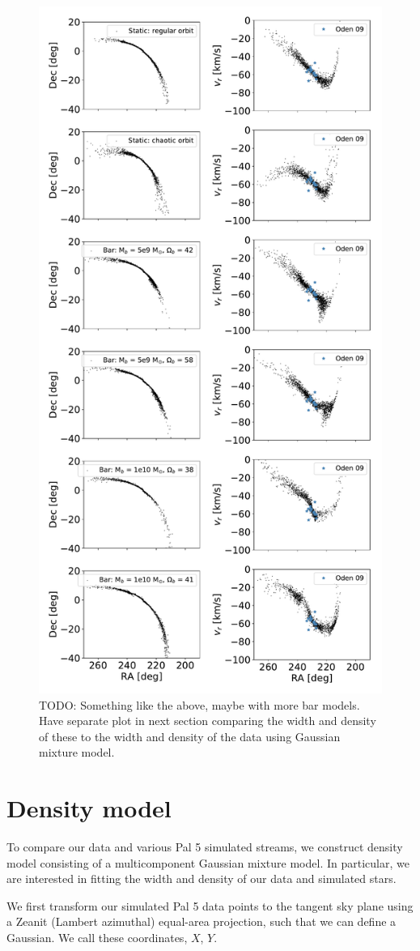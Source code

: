\documentclass[modern]{aastex62}
\newcommand{\todo}[1]{{\color{red} TODO: #1}}
\begin{document}
\begin{figure}
\centerline{\includegraphics[width=0.7\columnwidth]{bar.pdf}}
\caption{\todo{Something like the above, maybe with more bar models. Have separate plot in next section comparing the width and density of these to the width and density of the data using Gaussian mixture model. }}
\label{fig:sims}
\end{figure}


\section{Density model}
\label{sec:density}
To compare our data and various Pal 5 simulated streams, we construct density model consisting of a multicomponent Gaussian mixture model. In particular, we are interested in fitting the width and density of our data and simulated stars.  

We first transform our simulated Pal 5 data points to the tangent sky plane using a Zeanit (Lambert azimuthal) equal-area projection, such that we can define a Gaussian. We call these coordinates, $X$, $Y$.
\end{document}
